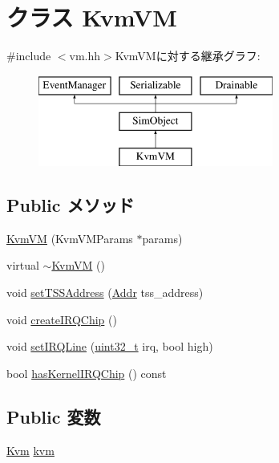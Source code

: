 \hypertarget{classKvmVM}{
\section{クラス KvmVM}
\label{classKvmVM}
}


{\ttfamily \#include $<$vm.hh$>$}KvmVMに対する継承グラフ:\begin{figure}[H]
\begin{center}
\leavevmode
\includegraphics[height=3cm]{classKvmVM}
\end{center}
\end{figure}
\subsection*{Public メソッド}
\begin{DoxyCompactItemize}
\item 
\hyperlink{classKvmVM_affe776b6ed46258acb05e93d1e3ea060}{KvmVM} (KvmVMParams $\ast$params)
\item 
virtual \hyperlink{classKvmVM_a57e34345c5d7c563ce7bdddcd0fb6017}{$\sim$KvmVM} ()
\item 
void \hyperlink{classKvmVM_a04e3bed0038549a704fe5c04015ce46d}{setTSSAddress} (\hyperlink{base_2types_8hh_af1bb03d6a4ee096394a6749f0a169232}{Addr} tss\_\-address)
\item 
void \hyperlink{group__KvmInterrupts_ga75f1140369bf3942bb93a75d1b3de2c9}{createIRQChip} ()
\item 
void \hyperlink{group__KvmInterrupts_ga5037b917c47fff611ecdd5b547655284}{setIRQLine} (\hyperlink{Type_8hh_a435d1572bf3f880d55459d9805097f62}{uint32\_\-t} irq, bool high)
\item 
bool \hyperlink{group__KvmInterrupts_ga4e9371a3b5e598c4cde8ebef65be940f}{hasKernelIRQChip} () const 
\end{DoxyCompactItemize}
\subsection*{Public 変数}
\begin{DoxyCompactItemize}
\item 
\hyperlink{classKvm}{Kvm} \hyperlink{classKvmVM_a4169de9bdb8aa1afbeed2acc231dbb7f}{kvm}
\end{DoxyCompactItemize}
